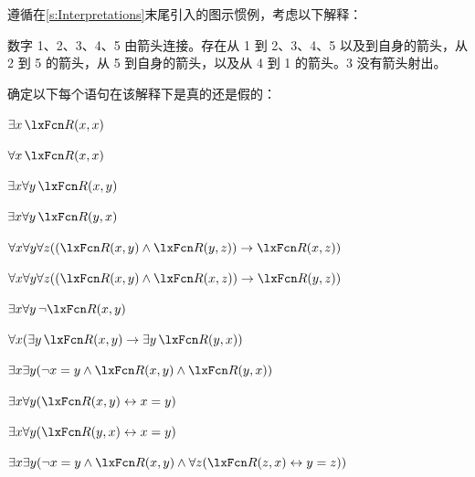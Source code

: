 \problempart
\label{pr.TorF3}
遵循在\cref{s:Interpretations}末尾引入的图示惯例，考虑以下解释：


\begin{center}
\begin{arialabel}{数字 1、2、3、4、5 由箭头连接。存在从 1 到 2、3、4、5 以及到自身的箭头，从 2 到 5 的箭头，从 5 到自身的箭头，以及从 4 到 1 的箭头。3 没有箭头射出。}
\end{arialabel}
\end{center}


确定以下每个语句在该解释下是真的还是假的：


\begin{compactlist}
\item $\exists x\, \atom{R}{x,x}$
\item $\forall x\, \atom{R}{x,x}$
\item $\exists x \forall y\, \atom{R}{x,y}$
\item $\exists x \forall y\, \atom{R}{y,x}$
\item $\forall x \forall y \forall z ((\atom{R}{x,y} \eand \atom{R}{y,z}) \eif \atom{R}{x,z})$
\item $\forall x \forall y \forall z ((\atom{R}{x,y} \eand \atom{R}{x,z}) \eif \atom{R}{y,z})$
\item $\exists x \forall y\, \enot \atom{R}{x,y}$
\item $\forall x(\exists y\, \atom{R}{x,y} \eif \exists y\, \atom{R}{y,x})$
\item $\exists x \exists y (\enot x = y \eand \atom{R}{x,y} \eand \atom{R}{y,x})$
\item $\exists x \forall y(\atom{R}{x,y} \eiff x = y)$
\item $\exists x \forall y(\atom{R}{y,x} \eiff x = y)$
\item $\exists x \exists y(\enot x = y \eand \atom{R}{x,y} \eand \forall z(\atom{R}{z,x} \eiff y = z))$
\end{compactlist}

